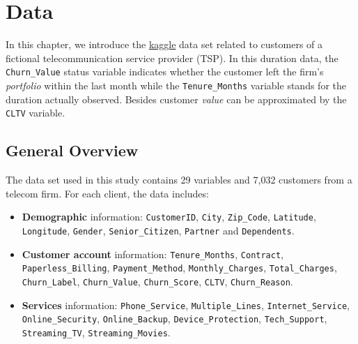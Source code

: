 \documentclass[
]{book}
\begin{document}
\hypertarget{data}{%
\chapter{Data}\label{data}}

In this chapter, we introduce the \href{https://www.kaggle.com/yeanzc/telco-customer-churn-ibm-data\%20set}{kaggle} data set related to customers of a fictional telecommunication service provider (TSP). In this duration data, the \texttt{Churn\_Value} status variable indicates whether the customer left the firm's \emph{portfolio} within the last month while the \texttt{Tenure\_Months} variable stands for the duration actually observed. Besides customer \emph{value} can be approximated by the \texttt{CLTV} variable.

\hypertarget{general-overview}{%
\section{General Overview}\label{general-overview}}

The data set used in this study contains 29 variables and 7,032 customers from a telecom firm. For each client, the data includes:

\begin{itemize}
\item
  \textbf{Demographic} information: \texttt{CustomerID}, \texttt{City}, \texttt{Zip\_Code}, \texttt{Latitude}, \texttt{Longitude}, \texttt{Gender}, \texttt{Senior\_Citizen}, \texttt{Partner} and \texttt{Dependents}.
\item
  \textbf{Customer account} information: \texttt{Tenure\_Months}, \texttt{Contract}, \texttt{Paperless\_Billing}, \texttt{Payment\_Method}, \texttt{Monthly\_Charges}, \texttt{Total\_Charges}, \texttt{Churn\_Label}, \texttt{Churn\_Value}, \texttt{Churn\_Score}, \texttt{CLTV}, \texttt{Churn\_Reason}.
\item
  \textbf{Services} information: \texttt{Phone\_Service}, \texttt{Multiple\_Lines}, \texttt{Internet\_Service}, \texttt{Online\_Security}, \texttt{Online\_Backup}, \texttt{Device\_Protection}, \texttt{Tech\_Support}, \texttt{Streaming\_TV}, \texttt{Streaming\_Movies}.
\end{itemize}
\end{document}

